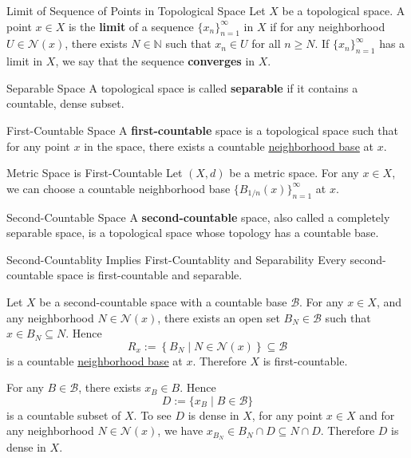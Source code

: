 \documentclass{report}
\begin{document}
\begin{definition}{Limit of Sequence of Points in Topological Space}{}
	Let $X$ be a topological space. A point $x\in X$ is the \textbf{limit} of a sequence $\{x_n\}_{n=1}^\infty$ in $X$ if for any neighborhood $U\in\mathcal{N}(x)$, there exists $N\in\mathbb{N}$ such that $x_n\in U$ for all $n\ge N$. If $\{x_n\}_{n=1}^\infty$ has a limit in $X$, we say that the sequence \textbf{converges} in $X$.
\end{definition}

\begin{definition}{Separable Space}{}
	A topological space is called \textbf{separable} if it contains a countable, dense subset.
\end{definition}


\begin{definition}{First-Countable Space}{}
	A \textbf{first-countable} space is a topological space such that for any point $x$ in the space, there exists a countable \hyperref[th:neighborhood_base]{neighborhood base} at $x$.
\end{definition}

\begin{example}{Metric Space is First-Countable}{}
	Let $(X,d)$ be a metric space. For any $x\in X$, we can choose a countable neighborhood base $\{B_{1/n}(x)\}_{n=1}^\infty$ at $x$.
\end{example}

\begin{definition}{Second-Countable Space}{}
	A \textbf{second-countable} space, also called a completely separable space, is a topological space whose topology has a countable base.
\end{definition}

\begin{proposition}{Second-Countablity Implies First-Countablity and Separability}{}
	Every second-countable space is first-countable and separable.
\end{proposition}
\begin{prf}
	Let $X$ be a second-countable space with a countable base $\mathcal{B}$. For any $x\in X$, and any neighborhood $N\in\mathcal{N}(x)$, there exists an open set $B_N\in \mathcal{B}$ such that $x\in B_N\subseteq N$. Hence 
	\[  
		R_x:=\left\{B_N \mid N\in\mathcal{N}(x)\right\} \subseteq \mathcal{B}
	\] 
	is a countable \hyperref[th:neighborhood_base]{neighborhood base} at $x$. Therefore $X$ is first-countable.

	For any $B\in\mathcal{B}$, there exists $x_B\in B$. Hence
	\[
		D:=\{x_B\mid B\in\mathcal{B}\}
	\]
	is a countable subset of $X$. To see $D$ is dense in $X$, for any point $x \in X$ and for any neighborhood $N\in\mathcal{N}(x)$, we have $x_{B_N}\in B_N \cap D\subseteq N \cap D $. Therefore $D$ is dense in $X$.
\end{prf}
\end{document}

